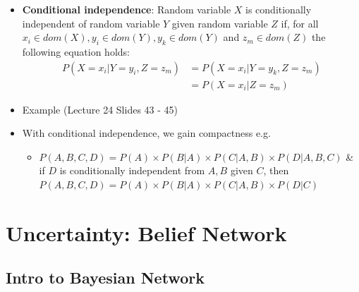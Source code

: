 \documentclass{article}
\begin{document}
\begin{itemize}
    \item \textbf{Conditional independence}: Random variable $X$ is conditionally independent of random variable $Y$ given random variable $Z$ if, for all $x_i \in dom(X), y_i \in dom(Y), y_k \in dom(Y)$ and $z_m \in dom(Z)$ the following equation holds:
    \begin{align*}
        P(X = x_i|Y = y_i, Z = z_m) &= P(X = x_i|Y = y_k, Z = z_m) \\
        &= P(X = x_i|Z = z_m)
    \end{align*}
    \item Example (Lecture 24 Slides 43 - 45)
    \item With conditional independence, we gain compactness e.g.
        \begin{itemize}
            \item $P(A, B, C, D) = P(A) \times P(B|A) \times P(C|A, B) \times P(D|A, B, C)$ \& if $D$ is conditionally independent from $A, B$ given $C$, then $P(A, B, C, D) = P(A) \times P(B|A) \times P(C|A, B) \times P(D|C)$
        \end{itemize}
\end{itemize}

\section{Uncertainty: Belief Network}

\subsection{Intro to Bayesian Network}
\end{document}
